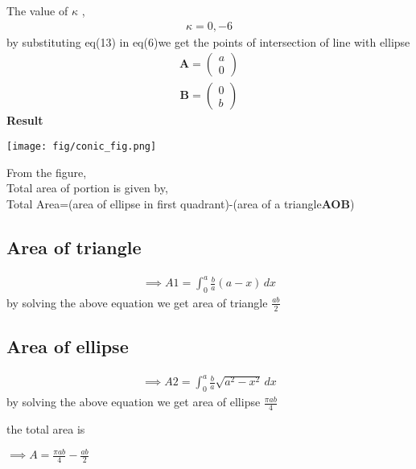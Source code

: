 \documentclass[10pt,a4paper]{report}
\newcommand{\myvec}[1]{\ensuremath{\begin{pmatrix}#1\end{pmatrix}}}
\let\vec\mathbf
\let\vec\mathbf
\begin{document}
\begin{multicols}{2}
The value of $\kappa$ ,\\
\begin{align}
    \kappa =0,-6
\end{align}
by substituting eq(13) in eq(6)we get the
points of intersection of line with ellipse \\
\begin{align}
    \vec{A}=\myvec{
a\\
0
    }
\end{align}
\begin{align}
    \vec{B}=\myvec{
0\\
b
    }
\end{align}
\textbf{Result}
\begin{center}
 \texttt{[image: fig/conic\_fig.png]}    
 \end{center}\vspace{1mm}
 From the figure,\\ \vspace{1mm}
Total area of portion is given by, \\ \vspace{1mm}
Total Area=(area of ellipse in first quadrant)-(area of a triangle\textbf{AOB})

\subsection*{Area of triangle}

\begin{align}
\implies A1=\int_{0}^{a} \frac{b}{a}(a-x) \,dx
\end{align}
by solving the above equation we get area of triangle \textbf{$\frac{ab}{2}$}
\subsection*{Area of ellipse}

\begin{align} 
\implies A2=\int_{0}^{a}\frac{b}{a}\sqrt{a^2-x^2} \,dx 
\end{align}
by solving the above equation we get area of ellipse $\frac{\pi ab}{4}$

the total area is

\vspace{3mm}
$\implies A=\frac{\pi ab}{4}-\frac{ab}{2}$\vspace{3mm}


\end{multicols}
\end{document}

